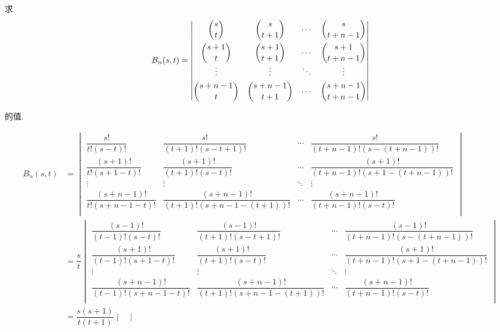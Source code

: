 \documentclass[color=black,device=normal,lang=cn,mode=geye]{elegantnote}
\begin{document}
\begin{exercise}%
    求
    \[B_n(s,t)=\begin{vmatrix}
        \dbinom{s}{t} & \dbinom{s}{t+1} & \cdots & \dbinom{s}{t+n-1} \\[10pt]
        \dbinom{s+1}{t} & \dbinom{s+1}{t+1} & \cdots & \dbinom{s+1}{t+n-1} \\
        \vdots & \vdots & \ddots & \vdots \\[4pt]
        \dbinom{s+n-1}{t} & \dbinom{s+n-1}{t+1} & \cdots & \dbinom{s+n-1}{t+n-1} \\
    \end{vmatrix}\]

    的值.
\end{exercise}
\begin{solution}
    \begin{landscape}
        \begin{align*}
            B_n(s,t) & =\begin{vmatrix}
                \dfrac{s!}{t!(s-t)!} & \dfrac{s!}{(t+1)!(s-t+1)!} & \cdots & \dfrac{s!}{(t+n-1)!(s-(t+n-1))!} \\[10pt]
                \dfrac{(s+1)!}{t!(s+1-t)!} & \dfrac{(s+1)!}{(t+1)!(s-t)!} & \cdots & \dfrac{(s+1)!}{(t+n-1)!(s+1-(t+n-1))!} \\
                \vdots & \vdots & \ddots & \vdots \\[4pt]
                \dfrac{(s+n-1)!}{t!(s+n-1-t)!} & \dfrac{(s+n-1)!}{(t+1)!(s+n-1-(t+1))!} & \cdots & \dfrac{(s+n-1)!}{(t+n-1)!(s-t)!} \\
            \end{vmatrix} \\
            & =\dfrac{s}{t}\begin{vmatrix}
                \dfrac{(s-1)!}{(t-1)!(s-t)!} & \dfrac{(s-1)!}{(t+1)!(s-t+1)!} & \cdots & \dfrac{(s-1)!}{(t+n-1)!(s-(t+n-1))!} \\[10pt]
                \dfrac{(s+1)!}{(t-1)!(s+1-t)!} & \dfrac{(s+1)!}{(t+1)!(s-t)!} & \cdots & \dfrac{(s+1)!}{(t+n-1)!(s+1-(t+n-1))!} \\
                \vdots & \vdots & \ddots & \vdots \\[4pt]
                \dfrac{(s+n-1)!}{(t-1)!(s+n-1-t)!} & \dfrac{(s+n-1)!}{(t+1)!(s+n-1-(t+1))!} & \cdots & \dfrac{(s+n-1)!}{(t+n-1)!(s-t)!} \\
            \end{vmatrix} \\
            & =\dfrac{s(s+1)}{t(t+1)}\begin{vmatrix}

\end{vmatrix}
\end{align*}
\end{landscape}
\end{solution}
\end{document}
